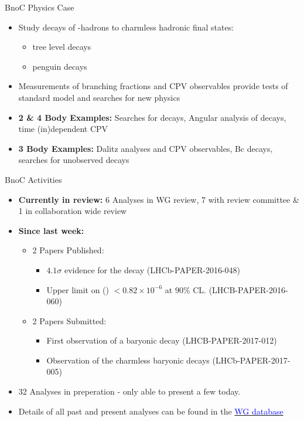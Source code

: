 \documentclass{beamer}
\begin{document}
\begin{frame}{BnoC Physics Case}
  \begin{itemize}
  \item Study decays of \bquark -hadrons to charmless hadronic final states:
    \begin{itemize}
    \item \decay{\bquark}{\uquark} tree level decays
    \item \decay{\bquark}{\squark, \dquark} penguin decays
  \end{itemize}
\item Measurements of branching fractions and CPV observables provide tests of standard model and searches for new physics
\item \textbf{2 \& 4 Body Examples:} Searches for  decays, Angular analysis of  decays, time (in)dependent CPV
\item \textbf{3 Body Examples:} Dalitz analyses and CPV observables, Bc decays, searches for unobserved decays
  \end{itemize}
\end{frame}

\begin{frame}{BnoC Activities}
  \begin{itemize}
  \item \textbf{Currently in review:}
    6 Analyses in WG review, 7 with review committee \& 1 in collaboration wide review
  \item \textbf{Since last \lhcb week:}
    \begin{itemize}
    \item 2 Papers Published:
      \begin{itemize}
      \item $4.1\sigma$ evidence for the decay \decay{\Bp}{\proton \Lbar} (LHCb-PAPER-2016-048)\\
      \item Upper limit on \BF(\decay{\Bs}{\phiz \etapr}) $< 0.82 \times 10^{-6}$ at $90\%$ CL. (LHCB-PAPER-2016-060)
      \end{itemize}
    \item 2 Papers Submitted:
      \begin{itemize}
      \item First observation of a baryonic \Bs decay (LHCB-PAPER-2017-012)
      \item Observation of the charmless baryonic decays  (LHCb-PAPER-2017-005)
      \end{itemize}
    \end{itemize}
  \item 32 Analyses in preperation - only able to present a few today.
  \item Details of all past and present analyses can be found in the \href{https://lhcb-wg.web.cern.ch/lhcb-WG/bnoc/list.py}{\textcolor{blue}{WG database}}
  \end{itemize}
\end{frame}
\end{document}
